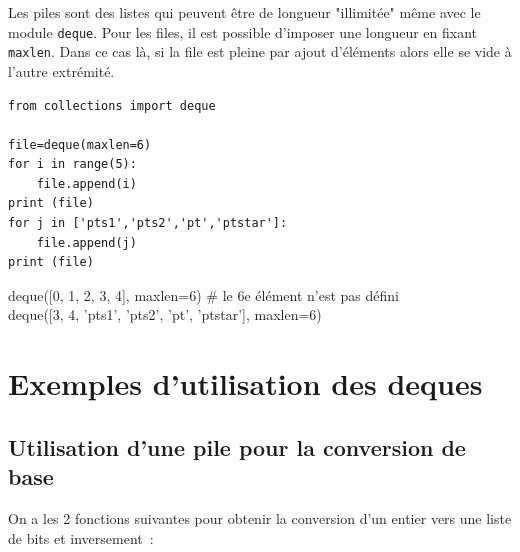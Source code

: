 Les piles sont des listes qui peuvent être de longueur "illimitée" même avec le module \texttt{deque}. Pour les files, il est possible d'imposer une longueur en fixant \texttt{maxlen}. Dans ce cas là, si la file est pleine par ajout d'éléments alors elle se vide à l'autre extrémité.


\begin{lstlisting}
from collections import deque

file=deque(maxlen=6)
for i in range(5):
    file.append(i)
print (file)
for j in ['pts1','pts2','pt','ptstar']:
    file.append(j)
print (file)
\end{lstlisting}

\begin{pythonshell}
deque([0, 1, 2, 3, 4], maxlen=6)  \# le 6e élément n'est pas défini\\
deque([3, 4, 'pts1', 'pts2', 'pt', 'ptstar'], maxlen=6)
\end{pythonshell}






\section{Exemples d'utilisation des deques}

\subsection{Utilisation d'une pile pour la conversion de base}

On a les 2 fonctions suivantes pour obtenir la conversion d'un entier vers une liste de bits et inversement~: 

